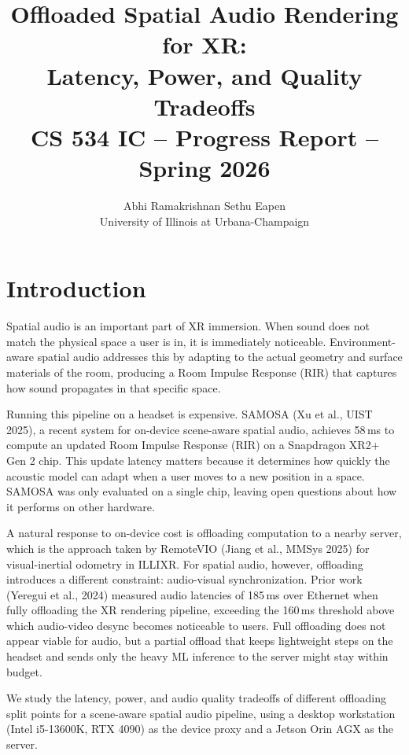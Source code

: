 \documentclass[11pt]{article}
\title{\textbf{Offloaded Spatial Audio Rendering for XR:\\
       Latency, Power, and Quality Tradeoffs}\\[6pt]
       \normalsize CS 534 IC -- Progress Report -- Spring 2026}
\author{Abhi Ramakrishnan \quad Sethu Eapen\\
        \small University of Illinois at Urbana-Champaign}
\date{}
\begin{document}
\maketitle
\thispagestyle{plain}

\section{Introduction}

Spatial audio is an important part of XR immersion. When sound does not
match the physical space a user is in, it is immediately noticeable.
Environment-aware spatial audio addresses this by adapting to the actual
geometry and surface materials of the room, producing a Room Impulse
Response (RIR) that captures how sound propagates in that specific space.

Running this pipeline on a headset is expensive. SAMOSA (Xu et al., UIST 2025),
a recent system for on-device scene-aware spatial audio, achieves 58\,ms
to compute an updated Room Impulse Response (RIR) on a Snapdragon XR2+ Gen 2
chip. This update latency matters because it determines how quickly the
acoustic model can adapt when a user moves to a new position in a space.
SAMOSA was only evaluated on a single chip, leaving open questions about
how it performs on other hardware.

A natural response to on-device cost is offloading computation to a nearby
server, which is the approach taken by RemoteVIO (Jiang et al., MMSys 2025)
for visual-inertial odometry in ILLIXR. For spatial audio, however, offloading
introduces a different constraint: audio-visual synchronization. Prior work
(Yeregui et al., 2024) measured audio latencies of 185\,ms over Ethernet
when fully offloading the XR rendering pipeline, exceeding the 160\,ms
threshold above which audio-video desync becomes noticeable to users. Full
offloading does not appear viable for audio, but a partial offload that keeps
lightweight steps on the headset and sends only the heavy ML inference to the
server might stay within budget.

We study the latency, power, and audio quality tradeoffs of different
offloading split points for a scene-aware spatial audio pipeline, using
a desktop workstation (Intel i5-13600K, RTX 4090) as the device proxy
and a Jetson Orin AGX as the server.

\end{document}
